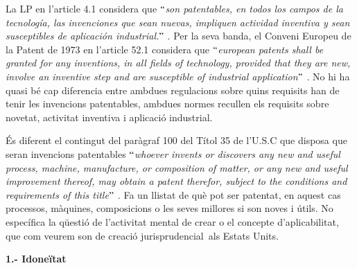 \documentclass[12pt]{article}
\begin{document}
\vspace{\baselineskip}
\begin{justify}
La LP en l’article 4.1 considera que $``$\textit{son patentables, en todos los campos de la tecnología, las invenciones que sean nuevas, impliquen actividad inventiva y sean susceptibles de aplicación industrial.$"$ }. Per la seva banda, el Conveni Europeu de la Patent de 1973 en l’article 52.1 considera que $``$\textit{european patents shall be granted for any inventions, in all fields of technology, provided that they are new, involve an inventive step and are susceptible of industrial application$"$ . }No hi ha quasi bé cap diferencia entre ambdues regulacions sobre quins requisits han de tenir les invencions patentables, ambdues normes recullen els requisits sobre novetat, activitat inventiva i aplicació industrial. 
\end{justify}\par


\vspace{\baselineskip}
\begin{justify}
És diferent el contingut del paràgraf 100 del Títol 35 de l’U.S.C que disposa que seran invencions patentables $``$\textit{whoever invents or discovers any new and useful process, machine, manufacture, or composition of matter, or any new and useful improvement thereof, may obtain a patent therefor, subject to the conditions and requirements of this title$"$ .} Fa un llistat de què pot ser patentat, en aquest cas processos, màquines, composicions o les seves millores si son noves i útils. No específica la qüestió de l’activitat mental de crear o el concepte d’aplicabilitat, que com veurem son de creació jurisprudencial\ als Estats Units.  
\end{justify}\par


\vspace{\baselineskip}
\textbf{1.- Idoneïtat }\par
\end{document}
